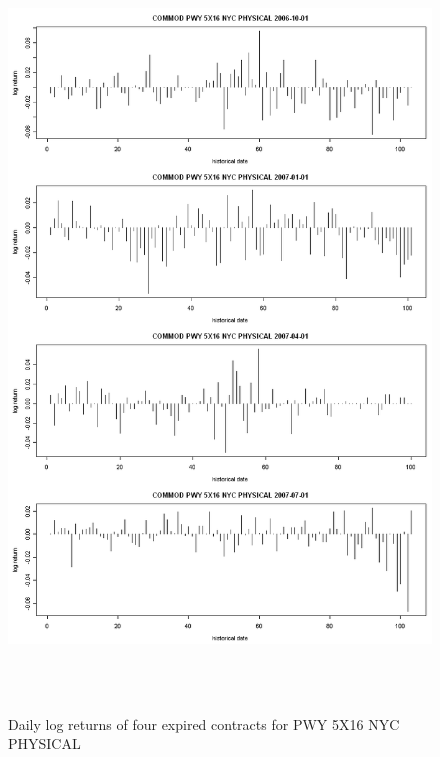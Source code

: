 \begin{figure}[htbp]
\centering
\includegraphics[width=6in, height=8in]{figures/pwy-peak-vol.png}
\caption{Daily log returns of four expired contracts for PWY 5X16 NYC PHYSICAL}
\label{pwy-peak-vol}
\end{figure}

